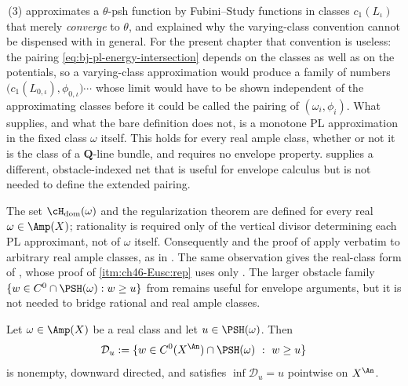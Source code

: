 \begin{remark}
\label{rem:ch46-fixed-class-is-the-point}
\,(3) approximates a $\theta$-psh function by
Fubini--Study functions in classes $c_1(L_\iota)$ that merely
\emph{converge} to $\theta$, and  explained why
the varying-class convention cannot be dispensed with in general.  For the
present chapter that convention is useless: the pairing
\eqref{eq:bj-pl-energy-intersection} depends on the classes as well as on
the potentials, so a varying-class approximation would produce a family of
numbers $\bigl(c_1(L_{0,\iota}),\phi_{0,\iota}\bigr)\cdots$ whose limit
would have to be shown independent of the approximating classes before it
could be called the pairing of $(\omega_i,\phi_i)$.  What
 supplies, and what the bare definition
does not, is a monotone PL approximation in the fixed class $\omega$
itself.  This holds for every real ample class, whether or not it is the
class of a $\mathbf Q$-line bundle, and requires no envelope property.
 supplies a different,
obstacle-indexed net that is useful for envelope calculus but is not needed
to define the extended pairing.
\end{remark}

\begin{remark}
\label{rem:ch46-real-classes}
The set $\cH_{\mathrm{dom}}(\omega)$ and the regularization theorem are
defined for every real $\omega\in\Amp(X)$; rationality is required only
of the vertical divisor determining each PL approximant, not of $\omega$
itself.  Consequently  and the proof of
 apply verbatim to arbitrary real
ample classes, as in \cite[Theorem~7.1]{BJ22}.  The same observation gives
the real-class form of , whose proof of
\cref{itm:ch46-Eusc:rep} uses only
.  The larger obstacle family
$\{w\in C^0\cap\PSH(\omega):w\ge u\}$ from
 remains useful for envelope
arguments, but it is not needed to bridge rational and real ample classes.
\end{remark}

\begin{lemma}
\label{lem:ch46-continuous-competitors}
Let $\omega\in\Amp(X)$ be a real class and let $u\in\PSH(\omega)$.
Then
\[
 \mathcal D_u:=\{w\in C^0(X^{\An})\cap\PSH(\omega)\ :\ w\ge u\}
\]
is nonempty, downward directed, and satisfies $\inf\mathcal D_u=u$ pointwise on
$X^{\An}$.
\end{lemma}

